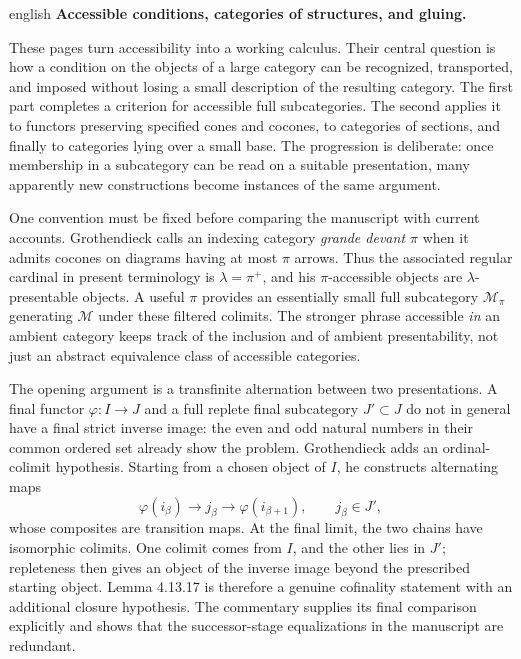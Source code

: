 \begin{otherlanguage*}{english}
\noindent\textbf{Accessible conditions, categories of structures, and gluing.}

These pages turn accessibility into a working calculus. Their central question is how a condition on the objects of a large category can be recognized, transported, and imposed without losing a small description of the resulting category. The first part completes a criterion for accessible full subcategories. The second applies it to functors preserving specified cones and cocones, to categories of sections, and finally to categories lying over a small base. The progression is deliberate: once membership in a subcategory can be read on a suitable presentation, many apparently new constructions become instances of the same argument.

One convention must be fixed before comparing the manuscript with current accounts. Grothendieck calls an indexing category \emph{grande devant $\pi$} when it admits cocones on diagrams having at most $\pi$ arrows. Thus the associated regular cardinal in present terminology is $\lambda=\pi^+$, and his $\pi$-accessible objects are $\lambda$-presentable objects. A useful $\pi$ provides an essentially small full subcategory $\mathcal M_\pi$ generating $\mathcal M$ under these filtered colimits. The stronger phrase accessible \emph{in} an ambient category keeps track of the inclusion and of ambient presentability, not just an abstract equivalence class of accessible categories.

The opening argument is a transfinite alternation between two presentations. A final functor $\varphi:I\to J$ and a full replete final subcategory $J'\subset J$ do not in general have a final strict inverse image: the even and odd natural numbers in their common ordered set already show the problem. Grothendieck adds an ordinal-colimit hypothesis. Starting from a chosen object of $I$, he constructs alternating maps
\[
 \varphi(i_\beta)\longrightarrow j_\beta
 \longrightarrow\varphi(i_{\beta+1}),
 \qquad j_\beta\in J',
\]
whose composites are transition maps. At the final limit, the two chains have isomorphic colimits. One colimit comes from $I$, and the other lies in $J'$; repleteness then gives an object of the inverse image beyond the prescribed starting object. Lemma 4.13.17 is therefore a genuine cofinality statement with an additional closure hypothesis. The commentary supplies its final comparison explicitly and shows that the successor-stage equalizations in the manuscript are redundant.


\end{otherlanguage*}
